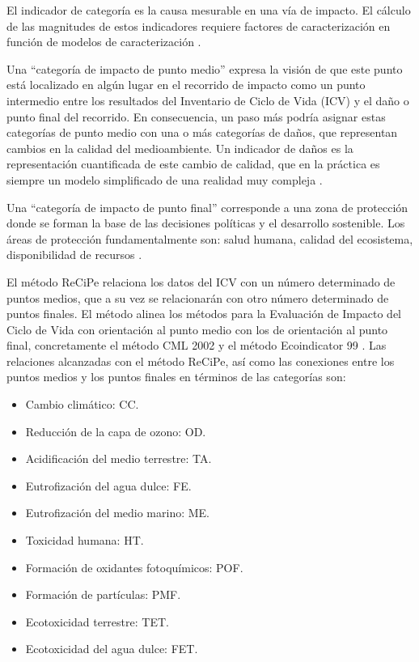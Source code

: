 El indicador de categoría es la causa mesurable en una vía de impacto. El cálculo de las magnitudes de estos indicadores requiere factores de caracterización en función de modelos de caracterización \cite{mlgceballos}.

Una ``categoría de impacto de punto medio'' expresa la visión de que este punto está localizado en algún lugar en el recorrido de impacto como un punto intermedio entre los resultados del Inventario de Ciclo de Vida (ICV) y el daño o punto final del recorrido. En consecuencia, un paso más podría asignar estas categorías de punto medio con una o más categorías de daños, que representan cambios en la calidad del medioambiente. Un indicador de daños es la representación cuantificada de este cambio de calidad, que en la práctica es siempre un modelo simplificado de una realidad muy compleja \cite{ecoinventlcia}.

Una ``categoría de impacto de punto final'' corresponde a una zona de protección donde se forman la base de las decisiones políticas y el desarrollo sostenible. Los áreas de protección fundamentalmente son: salud humana, calidad del ecosistema, disponibilidad de recursos \cite{mlgceballos}.

El método ReCiPe relaciona los datos del ICV con un número determinado de puntos medios, que a su vez se relacionarán con otro número determinado de puntos finales. El método alinea los métodos para la Evaluación de Impacto del Ciclo de Vida con orientación al punto medio con los de orientación al punto final, concretamente el método CML 2002 y el método Ecoindicator 99 \cite{unijaume}. Las relaciones alcanzadas con el método ReCiPe, así como las conexiones entre los puntos medios y los puntos finales en términos de las categorías son:

\begin{itemize}
  \item Cambio climático: CC.
  \item Reducción de la capa de ozono: OD.
  \item Acidificación del medio terrestre: TA.
  \item Eutrofización del agua dulce: FE.
  \item Eutrofización del medio marino: ME.
  \item Toxicidad humana: HT.
  \item Formación de oxidantes fotoquímicos: POF.
  \item Formación de partículas: PMF.
  \item Ecotoxicidad terrestre: TET.
  \item Ecotoxicidad del agua dulce: FET.
\end{itemize}

